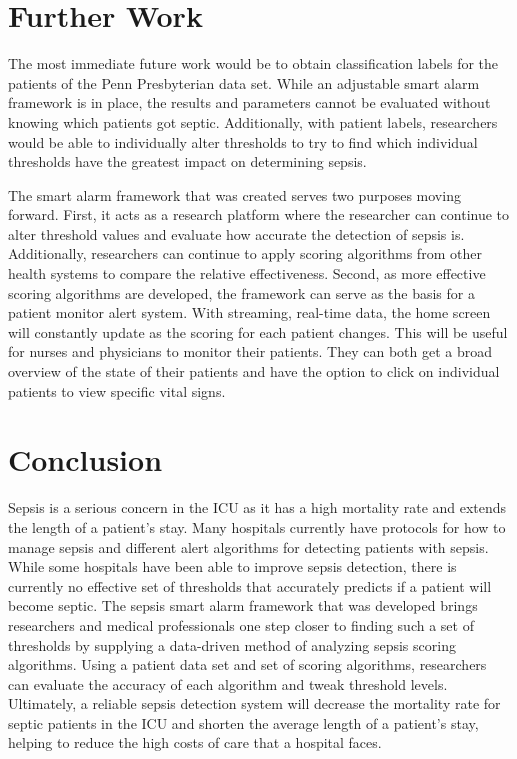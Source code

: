 \documentclass{sig-alternate}
\begin{document}
\vspace{10pt}
\section{Further Work}
\vspace{10pt}
\label{sec:furtherwork}

The most immediate future work would be to obtain classification labels for the patients of the Penn Presbyterian data set.  While an adjustable smart alarm framework is in place, the results and parameters cannot be evaluated without knowing which patients got septic.  Additionally, with patient labels, researchers would be able to individually alter thresholds to try to find which individual thresholds have the greatest impact on determining sepsis.  

The smart alarm framework that was created serves two purposes moving forward.  First, it acts as a research platform where the researcher can continue to alter threshold values and evaluate how accurate the detection of sepsis is.  Additionally, researchers can continue to apply scoring algorithms from other health systems to compare the relative effectiveness.  Second, as more effective scoring algorithms are developed, the framework can serve as the basis for a patient monitor alert system.  With streaming, real-time data, the home screen will constantly update as the scoring for each patient changes.  This will be useful for nurses and physicians to monitor their patients.  They can both get a broad overview of the state of their patients and have the option to click on individual patients to view specific vital signs.

\vspace{10pt}
\section{Conclusion}
\vspace{10pt}
\label{sec:conclusion}

Sepsis is a serious concern in the ICU as it has a high mortality rate and extends the length of a patient's stay.  Many hospitals currently have protocols for how to manage sepsis and different alert algorithms for detecting patients with sepsis.  While some hospitals have been able to improve sepsis detection, there is currently no effective set of thresholds that accurately predicts if a patient will become septic.  The sepsis smart alarm framework that was developed brings researchers and medical professionals one step closer to finding such a set of thresholds by supplying a data-driven method of analyzing sepsis scoring algorithms.  Using a patient data set and set of scoring algorithms, researchers can evaluate the accuracy of each algorithm and tweak threshold levels.  Ultimately, a reliable sepsis detection system will decrease the mortality rate for septic patients in the ICU and shorten the average length of a patient's stay, helping to reduce the high costs of care that a hospital faces.
\end{document}
